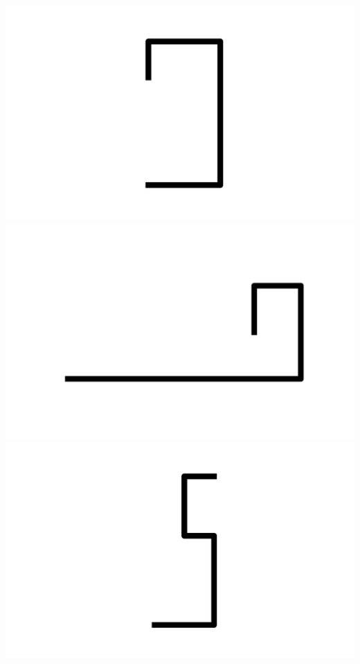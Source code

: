 \documentclass[]{report}
\begin{document}
\includegraphics[scale=.1]{pictures/21/state_cluster_shapes_322.pdf} 
\includegraphics[scale=.1]{pictures/21/state_cluster_shapes_323.pdf} 
\includegraphics[scale=.1]{pictures/21/state_cluster_shapes_324.pdf} 
\end{document}
